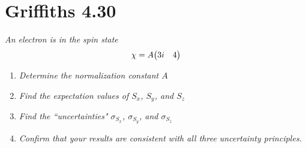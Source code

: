 \documentclass[12pt]{article}
\begin{document}
\section*{Griffiths 4.30}
{\sl An electron is in the spin state}
\[\chi = A \mqty(3i & 4)\]
\begin{enumerate}[label=\alph*)]
\item {\sl Determine the normalization constant $A$}

\item {\sl Find the expectation values of $S_x$, $S_y$, and $S_z$}

\item {\sl Find the ``uncertainties" $\sigma_{S_x}$, $\sigma_{S_y}$, and $\sigma_{S_z}$}

\item {\sl Confirm that your results are consistent with all three uncertainty principles.}
\end{enumerate}
\end{document}
